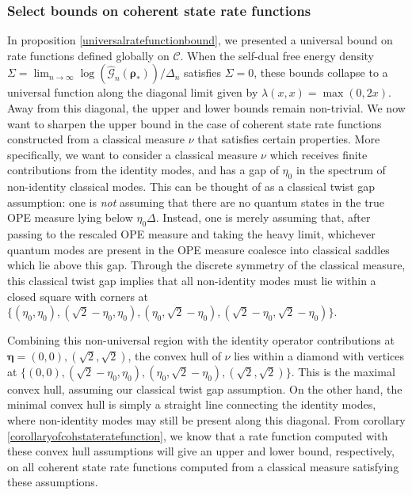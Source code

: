 \documentclass[a4paper,11pt]{article}
\theoremstyle{plain}
\theoremstyle{definition}
\theoremstyle{remark}
\newcommand{\bs}[1]{\boldsymbol{#1}}
\newcommand{\De}{\Delta}
\begin{document}
\subsubsection{Select bounds on coherent state rate functions}
\label{selectbounds}
In proposition \ref{universalratefunctionbound}, we presented a universal bound on rate functions defined globally on $\mathscr{C}$. When the self-dual free energy density $\Sigma = \lim_{n\to\infty} \log(\widehat{\mathcal{G}}_n(\bs{\rho}_*))/\De_n$ satisfies $\Sigma = 0$, these bounds collapse to a universal function along the diagonal limit given by $\lambda(x,x) = \max(0,2x)$. Away from this diagonal, the upper and lower bounds remain non-trivial. We now want to sharpen the upper bound in the case of coherent state rate functions constructed from a classical measure $\nu$ that satisfies certain properties. More specifically, we want to consider a classical measure $\nu$ which receives finite contributions from the identity modes, and has a gap of $\eta_0$ in the spectrum of non-identity classical modes. This can be thought of as a classical twist gap assumption: one is \textit{not} assuming that there are no quantum states in the true OPE measure lying below $ \eta_0\De$. Instead, one is merely assuming that, after passing to the rescaled OPE measure and taking the heavy limit, whichever quantum modes are present in the OPE measure coalesce into classical saddles which lie above this gap. Through the discrete symmetry of the classical measure, this classical twist gap implies that all non-identity modes must lie within a closed square with corners at $\{(\eta_0,\eta_0),(\sqrt{2} - \eta_0,\eta_0),(\eta_0,\sqrt{2}-\eta_0),(\sqrt{2}-\eta_0,\sqrt{2}-\eta_0)\}$. 

Combining this non-universal region with the identity operator contributions at $\bs{\eta} = (0,0),(\sqrt{2},\sqrt{2})$, the convex hull of $\nu$ lies within a diamond with vertices at $\{(0,0),(\sqrt{2} -\eta_0,\eta_0),(\eta_0,\sqrt{2} - \eta_0),(\sqrt{2},\sqrt{2})\}$. This is the maximal convex hull, assuming our classical twist gap assumption. On the other hand, the minimal convex hull is simply a straight line connecting the identity modes, where non-identity modes may still be present along this diagonal. From corollary \ref{corollaryofcohstateratefunction}, we know that a rate function computed with these convex hull assumptions will give an upper and lower bound, respectively, on all coherent state rate functions computed from a classical measure satisfying these assumptions. 
\end{document}
